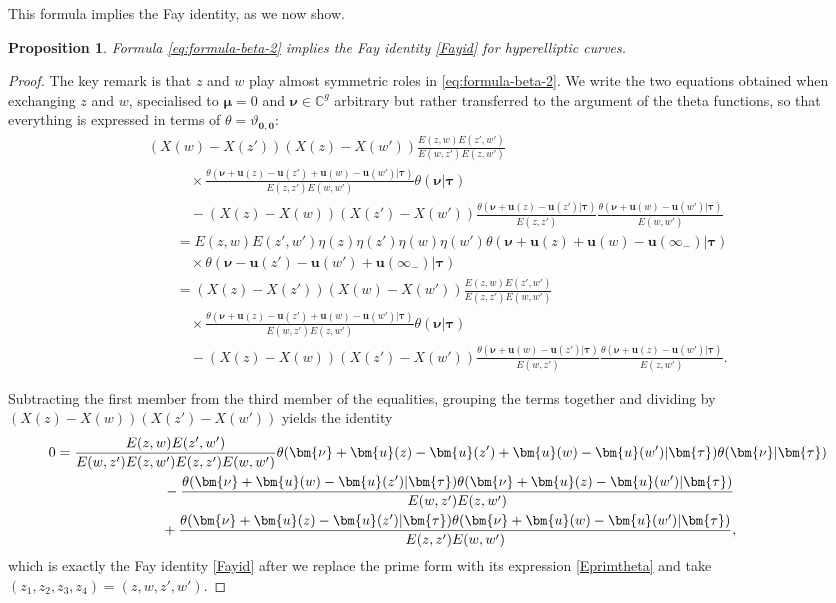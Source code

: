 \documentclass[pdftex]{sigma}
\numberwithin{equation}{section}
\newtheorem{prop}[Theorem]{Proposition}
 { \theoremstyle{definition}
\newtheorem{Definition}[Theorem]{Definition}
\newtheorem{Note}[Theorem]{Note}
\newtheorem{Example}[Theorem]{Example}
\newtheorem{Remark}[Theorem]{Remark} }
\begin{document}
This formula implies the Fay identity, as we now show.
\begin{prop}\label{corol:fay-from-beta=2}
 Formula \eqref{eq:formula-beta-2} implies the Fay identity \eqref{Fayid} for hyperelliptic curves.
\end{prop}
\begin{proof}\allowdisplaybreaks
 The key remark is that $z$ and $w$ play almost symmetric roles in
 \eqref{eq:formula-beta-2}. We write the two equations obtained when exchanging $z$ and $w$, specialised to $\bm{\mu} = 0$ and $\bm{\nu} \in \mathbb{C}^g$ arbitrary but rather transferred to the argument of the theta functions, so that everything is expressed in terms of $\theta = \vartheta_{\bm{0},\bm{0}}$:  \begin{gather*}
	 (X(w) - X(z'))(X(z) - X(w'))\frac{E(z,w)E(z',w')}{E(w,z')E(z,w')}\\
\qquad\quad{}\times \frac{\theta (\bm{\nu} + \bm{u}(z) - \bm{u}(z') + \bm{u}(w) - \bm{u}(w') |\bm{\tau} )}{E(z,z')E(w,w')}\theta (\bm{\nu} |\bm{\tau} )\\
\qquad\quad{} -(X(z) - X(w))(X(z') - X(w')) \frac{\theta(\bm{\nu} + \bm{u}(z) - \bm{u}(z') |\bm{\tau} )}{E(z,z')}\frac{\theta (\bm{\nu} + \bm{u}(w) - \bm{u}(w') |\bm{\tau} )}{E(w,w')}\\
\qquad{} = E(z,w)E(z',w')\eta(z)\eta(z')\eta(w)\eta(w')\theta (\bm{\nu} + \bm{u}(z) + \bm{u}(w) - \bm{u}(\infty_-) |\bm{\tau} )\\
\qquad\quad{}\times \theta (\bm{\nu} - \bm{u}(z') - \bm{u}(w') + \bm{u}(\infty_-) |\bm{\tau} )\\
\qquad{}  = (X(z) - X(z'))(X(w) - X(w'))\frac{E(z,w)E(z',w')}{E(z,z')E(w,w')}\\
\qquad\quad{}\times	 \frac{\theta (\bm{\nu} + \bm{u}(z) - \bm{u}(z') + \bm{u}(w) - \bm{u}(w') |\bm{\tau} )}{E(w,z')E(z,w')} \theta (\bm{\nu} |\bm{\tau} )\\
\qquad\quad{}  -(X(z)- X(w))(X(z') - X(w'))\frac{\theta (\bm{\nu} + \bm{u}(w) - \bm{u}(z') |\bm{\tau} )}{E(w,z')}\frac{\theta (\bm{\nu} + \bm{u}(z) - \bm{u}(w') |\bm{\tau} )}{E(z,w')}.
 \end{gather*}

 Subtracting the first member from the third member of the equalities, grouping the terms together and dividing by $(X(z) - X(w))(X(z') - X(w'))$ yields the identity
 \begin{gather*}
 0 =\frac{E(z,w)E(z',w')}{E(w,z')E(z,w')E(z,z')E(w,w')} \theta (\bm{\nu} + \bm{u}(z) - \bm{u}(z') + \bm{u}(w) - \bm{u}(w') |\bm{\tau} )\theta (\bm{\nu} |\bm{\tau} ) \\
\hphantom{0 =}{}
- \frac{\theta (\bm{\nu} + \bm{u}(w) - \bm{u}(z') |\bm{\tau} )\theta (\bm{\nu} + \bm{u}(z) - \bm{u}(w') |\bm{\tau} )}{E(w,z')E(z,w')}\\
\hphantom{0 =}{}
+ \frac{\theta (\bm{\nu} + \bm{u}(z) - \bm{u}(z') |\bm{\tau} )\theta (\bm{\nu} + \bm{u}(w) - \bm{u}(w') |\bm{\tau} )}{E(z,z')E(w,w')},
 \end{gather*}
 which is exactly the Fay identity \eqref{Fayid} after we replace the prime form with its expression \eqref{Eprimtheta} and take $(z_1,z_2,z_3,z_4) = (z,w,z',w')$.
 \end{proof}
\end{document}
